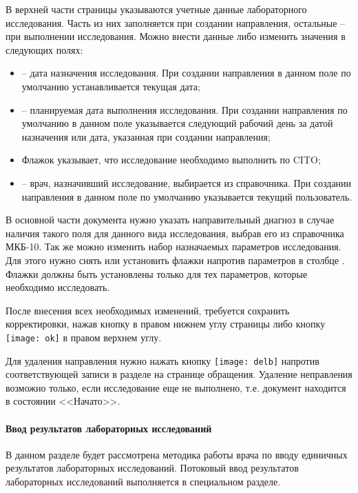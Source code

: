 {В верхней части страницы указываются учетные данные лабораторного исследования. Часть из них заполняется при создании направления, остальные -- при выполнении исследования. Можно внести данные либо изменить значения в следующих полях:

\begin{itemize}
 \item {} -- дата назначения исследования. При создании направления в данном поле по умолчанию устанавливается текущая дата;
 \item {} -- планируемая дата выполнения исследования. При создании направления по умолчанию в данном поле указывается следующий рабочий день за датой назначения или дата, указанная при создании направления;
 \item Флажок  указывает, что исследование необходимо выполнить по CITO;
 \item {} -- врач, назначивший исследование, выбирается из справочника. При создании направления в данном поле по умолчанию указывается текущий пользователь.  
\end{itemize} 

В основной части документа нужно указать направительный диагноз в случае наличия такого поля для данного вида исследования, выбрав его из справочника МКБ-10. Так же можно изменить набор назначаемых параметров исследования. Для этого нужно снять или установить флажки напротив параметров в столбце . Флажки должны быть установлены только для тех параметров, которые необходимо исследовать.  

После внесения всех необходимых изменений, требуется сохранить корректировки, нажав кнопку  в правом нижнем углу страницы либо кнопку \texttt{[image: ok]} в правом верхнем углу.    

Для удаления направления нужно нажать кнопку \texttt{[image: delb]} напротив соответствующей записи в разделе  на странице обращения. Удаление неправления возможно только, если исследование еще не выполнено, т.е. документ находится в состоянии <<Начато>>.

{
\paragraph{Ввод результатов лабораторных исследований} \label{ev_obr_rez}
 
В данном разделе будет рассмотрена методика работы врача по вводу единичных результатов лабораторных исследований. Потоковый ввод результатов лабораторных исследований выполняется в специальном разделе.

}}
